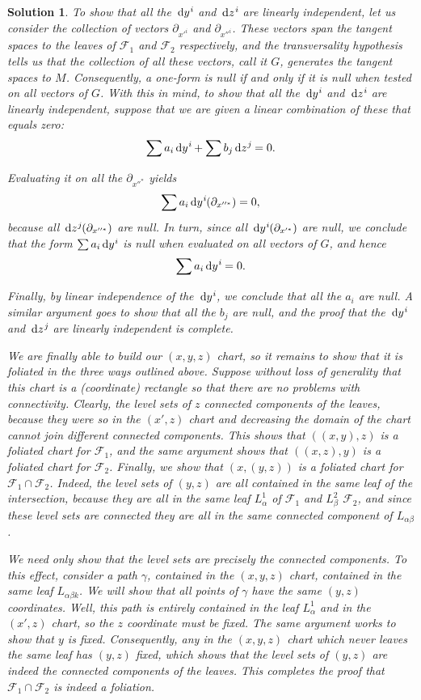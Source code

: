\documentclass{article}
\theoremstyle{nonumberplain}
\newtheorem{sol}{Solution}
\newcommand{\FF}{\mathcal{F}}
\begin{document}
\begin{sol}
To show that all the $\dl y^i$ and $\dl z^i$ are linearly independent, let us consider the collection of vectors $\partial_{x'^i}$ and $\partial_{x''^i}$. These vectors span the tangent spaces to the leaves of $\FF_1$ and $\FF_2$ respectively, and the transversality hypothesis tells us that the collection of all these vectors, call it $G$, generates the tangent spaces to $M$. Consequently, a one-form is null if and only if it is null when tested on all vectors of $G$. With this in mind, to show that all the $\dl y^i$ and $\dl z^i$ are linearly independent, suppose that we are given a linear combination of these that equals zero:
\[\sum a_i \dl y^i + \sum b_j \dl z^j = 0.\]

Evaluating it on all the $\partial_{x''^*}$ yields
\[\sum a_i \dl y^i(\partial_{x''^*}) = 0,\]
because all $\dl z^j(\partial_{x''^*})$ are null. In turn, since all $\dl y^i(\partial_{x'^*})$ are null, we conclude that the form $\sum a_i \dl y^i$ is null when evaluated on all vectors of $G$, and hence
\[\sum a_i \dl y^i = 0.\]

Finally, by linear independence of the $\dl y^i$, we conclude that all the $a_i$ are null. A similar argument goes to show that all the $b_j$ are null, and the proof that the $\dl y^i$ and $\dl z^j$ are linearly independent is complete.

We are finally able to build our $(x,y,z)$ chart, so it remains to show that it is foliated in the three ways outlined above. Suppose without loss of generality that this chart is a (coordinate) rectangle so that there are no problems with connectivity. Clearly, the level sets of $z$ connected components of the leaves, because they were so in the $(x',z)$ chart and decreasing the domain of the chart cannot join different connected components. This shows that $((x,y),z)$ is a foliated chart for $\FF_1$, and the same argument shows that $((x,z),y)$ is a foliated chart for $\FF_2$. Finally, we show that $(x,(y,z))$ is a foliated chart for $\FF_1 \cap \FF_2$. Indeed, the level sets of $(y,z)$ are all contained in the same leaf of the intersection, because they are all in the same leaf $L^1_\alpha$ of $\FF_1$ and $L^2_\beta$ $\FF_2$, and since these level sets are connected they are all in the same connected component of $L_{\alpha\beta}$.

We need only show that the level sets are precisely the connected components. To this effect, consider a path $\gamma$, contained in the $(x,y,z)$ chart, contained in the same leaf $L_{\alpha\beta k}$. We will show that all points of $\gamma$ have the same $(y,z)$ coordinates. Well, this path is entirely contained in the leaf $L^1_\alpha$ and in the $(x',z)$ chart, so the $z$ coordinate must be fixed. The same argument works to show that $y$ is fixed. Consequently, any in the $(x,y,z)$ chart which never leaves the same leaf has $(y,z)$ fixed, which shows that the level sets of $(y,z)$ are indeed the connected components of the leaves. This completes the proof that $\FF_1 \cap \FF_2$ is indeed a foliation.
\end{sol}
\end{document}
